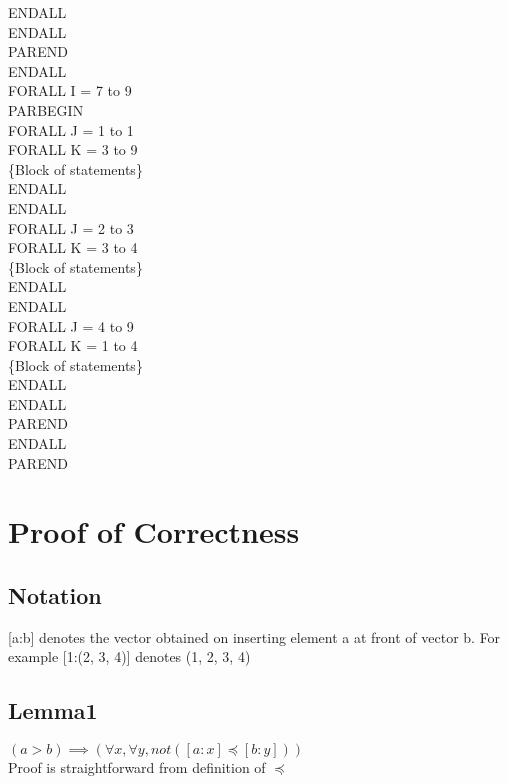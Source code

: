 \indent \indent ENDALL\\
\indent ENDALL\\
\indent PAREND\\
ENDALL\\
FORALL I = 7 to 9\\
\indent PARBEGIN\\
\indent FORALL J = 1 to 1\\
\indent \indent FORALL K = 3 to 9\\
\indent \indent \indent \{Block of statements\}\\
\indent \indent ENDALL\\
\indent ENDALL\\
\indent FORALL J = 2 to 3\\
\indent \indent FORALL K = 3 to 4\\
\indent \indent \indent \{Block of statements\}\\
\indent \indent ENDALL\\
\indent ENDALL\\
\indent FORALL J = 4 to 9\\
\indent \indent FORALL K = 1 to 4\\
\indent \indent \indent \{Block of statements\}\\
\indent \indent ENDALL\\
\indent ENDALL\\
\indent PAREND\\
ENDALL\\
PAREND\\





\section{Proof of Correctness}

\subsection{Notation}

[a:b] denotes the vector obtained on inserting element a at front of vector b.
For example [1:(2, 3, 4)] denotes (1, 2, 3, 4)

\subsection{Lemma1}
$(a > b) \implies (\forall x, \forall y, not([a:x] \preceq [b:y]))$\\
Proof is straightforward from definition of $\preceq$\\

